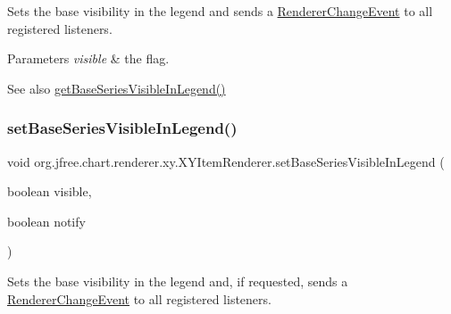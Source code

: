 Sets the base visibility in the legend and sends a \mbox{\hyperlink{}{Renderer\+Change\+Event}} to all registered listeners.


\begin{DoxyParams}{Parameters}
{\em visible} & the flag.\\
\hline
\end{DoxyParams}
\begin{DoxySeeAlso}{See also}
\mbox{\hyperlink{interfaceorg_1_1jfree_1_1chart_1_1renderer_1_1xy_1_1_x_y_item_renderer_ac39942d497bba9355b4b1e597028ce1a}{get\+Base\+Series\+Visible\+In\+Legend()}} 
\end{DoxySeeAlso}
\mbox{\label{interfaceorg_1_1jfree_1_1chart_1_1renderer_1_1xy_1_1_x_y_item_renderer_a2f25194d093c7be114c5119456e584cb}} 
\subsubsection{\texorpdfstring{set\+Base\+Series\+Visible\+In\+Legend()}{setBaseSeriesVisibleInLegend()}\hspace{0.1cm}{\footnotesize\ttfamily [2/2]}}
{\footnotesize\ttfamily void org.\+jfree.\+chart.\+renderer.\+xy.\+X\+Y\+Item\+Renderer.\+set\+Base\+Series\+Visible\+In\+Legend (\begin{DoxyParamCaption}\item[{boolean}]{visible,  }\item[{boolean}]{notify }\end{DoxyParamCaption})}

Sets the base visibility in the legend and, if requested, sends a \mbox{\hyperlink{}{Renderer\+Change\+Event}} to all registered listeners.


